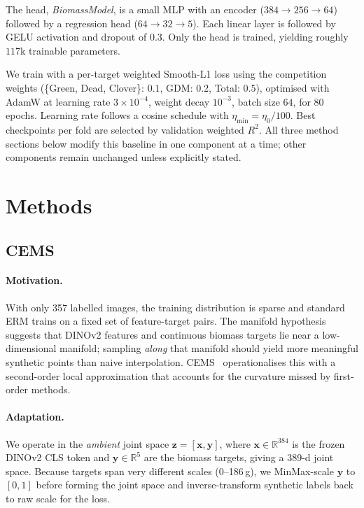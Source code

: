 \documentclass[10pt, a4paper]{article}
\begin{document}
The head, \textit{BiomassModel}, is a small MLP with an encoder
($384 \to 256 \to 64$) followed by a regression head ($64 \to 32 \to 5$). Each
linear layer is followed by GELU activation and dropout of $0.3$. Only the head
is trained, yielding roughly $117$k trainable parameters.

We train with a per-target weighted Smooth-L1 loss using the competition weights
(\{Green, Dead, Clover\}: $0.1$, GDM: $0.2$, Total: $0.5$), optimised with AdamW
at learning rate $3 \times 10^{-4}$, weight decay $10^{-3}$, batch size $64$,
for $80$ epochs. Learning rate follows a cosine schedule with
$\eta_{\min} = \eta_0 / 100$. Best checkpoints per fold are selected by
validation weighted $R^{2}$. All three method sections below modify this
baseline in one component at a time; other components remain unchanged unless
explicitly stated.

\section{Methods}

\subsection{CEMS}
\label{sec:cems}

\paragraph{Motivation.}
With only 357 labelled images, the training distribution is sparse and standard
ERM trains on a fixed set of feature-target pairs. The manifold hypothesis
suggests that DINOv2 features and continuous biomass targets lie near a
low-dimensional manifold; sampling \emph{along} that manifold should yield more
meaningful synthetic points than naive interpolation. CEMS~\citep{kaufman2025}
operationalises this with a second-order local approximation that accounts for
the curvature missed by first-order methods.

\paragraph{Adaptation.}
We operate in the \emph{ambient} joint space $\mathbf{z}{=}[\mathbf{x},\mathbf{y}]$,
where $\mathbf{x}{\in}\mathbb{R}^{384}$ is the frozen DINOv2 CLS token and
$\mathbf{y}{\in}\mathbb{R}^{5}$ are the biomass targets, giving a 389-d joint
space. Because targets span very different scales (0--186\,g), we MinMax-scale
$\mathbf{y}$ to $[0,1]$ before forming the joint space and inverse-transform
synthetic labels back to raw scale for the loss.
\end{document}
